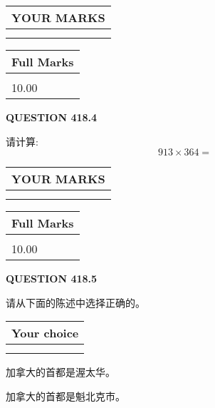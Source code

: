 \documentclass{ctexart}
\begin{document}
\vspace{0.2in}
  
\noindent\begin{tabular}{|l|}
\hline
 YOUR MARKS  \\
\hline
 \\ 
 \\ 
\hline
\end{tabular}
\hspace{0.05in} \begin{tabular}{|l|}
\hline
 Full Marks  \\
\hline
 \\ 
10.00 \\
\hline
\end{tabular}
{\textbf{\Large{QUESTION
418.4 
}}}
  
  
 
请计算:
\begin{equation}
913  \times    %
364 = \nonumber
\end{equation}
 

 

 
  
\vspace{0.2in}
  
\noindent\begin{tabular}{|l|}
\hline
 YOUR MARKS  \\
\hline
 \\ 
 \\ 
\hline
\end{tabular}
\hspace{0.05in} \begin{tabular}{|l|}
\hline
 Full Marks  \\
\hline
 \\ 
10.00 \\
\hline
\end{tabular}
{\textbf{\Large{QUESTION
418.5 
}}}
  
  
请从下面的陈述中选择正确的。
  
  
\noindent\hspace{3.0in} \begin{tabular}{|l|}
\hline
Your choice \\
\hline
 \\ 
 \\ 
\hline
\end{tabular}
  
  
 
 
加拿大的首都是渥太华。
 
 
加拿大的首都是魁北克市。
 
\end{document}
